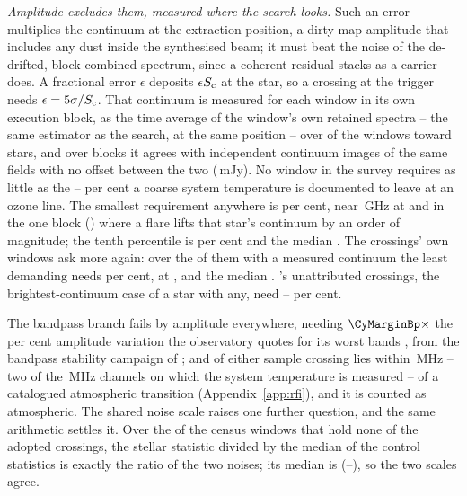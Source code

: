 \emph{Amplitude excludes them, measured where the search looks.} Such an
error multiplies the continuum at the extraction position, a dirty-map
amplitude that includes any dust inside the synthesised beam; it must beat
the noise of the de-drifted, block-combined spectrum, since a
coherent residual stacks as a carrier does. A fractional error $\epsilon$
deposits $\epsilon S_{\rm c}$ at the star, so a crossing at the trigger needs
$\epsilon=5\sigma/S_{\rm c}$. That continuum is measured for each window in
its own execution block, as the time average of the window's own retained
spectra -- the same estimator as the search, at the same position -- over
\CyNWinMeas{} of the \CyNWinTot{} windows toward \CyNStarMeas{} stars, and
over \CyNRouteBlock{} blocks it agrees with independent continuum images of
the same fields with no offset between the two (\CyRouteBiasMJy\,mJy).
No window in the survey requires as little as the
\CySpecTsysLo--\CySpecTsysHi{} per cent a coarse system temperature is
documented to leave at an ozone line. The smallest requirement anywhere is
\CyEpsMinPct{} per cent, near \CyEpsMinGHz\,GHz at \CyEpsMinStar{} and in the
one block (\texttt{\CyEpsMinBlock}) where a flare lifts that star's continuum
by an order of magnitude; the tenth percentile is \CyEpsTenthPct{} per cent
and the median \CyEpsMedPct. The crossings' own windows ask more again: over
the \CyNCrossMeas{} of them with a measured continuum the least demanding
needs \CyCrossEpsLoPct{} per cent, at \CyCrossEpsLoStar, and the median
\CyCrossEpsMedPct. \CxAuStar's \CyAuNCross{} unattributed crossings, the
brightest-continuum case of a star with any, need
\CyAuCrossEpsLoPct--\CyAuCrossEpsHiPct{} per cent.

The bandpass branch fails by amplitude everywhere, needing
$\CyMarginBp\times$ the \CdSpecBpWorst{} per cent amplitude variation the
observatory quotes for its worst bands \citep{ALMAKBBandpass}, from the
bandpass stability campaign of \citet{ALMATechNote15}; and of either sample
\ScNInRad{} crossing lies within \ScRadMHz\,MHz -- two of the
\CdSpecTsysRes\,MHz channels on which the system temperature is measured --
of a catalogued atmospheric transition
(Appendix~\ref{app:rfi}), and it is counted as atmospheric. The shared noise scale raises one
further question, and the same arithmetic settles it. Over the \NsrNWin{} of
the \NWindows{} census windows that hold none of the adopted crossings, the
stellar statistic divided by the median of the \NCtrl{} control
statistics is exactly the ratio of the two noises; its median is \NsrMed{}
(\NsrLo--\NsrHi), so the two scales agree.

